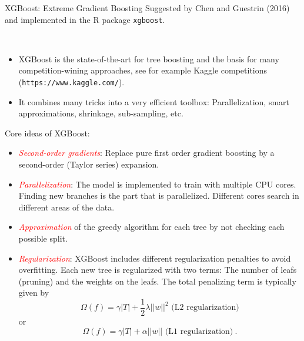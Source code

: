 \documentclass[
  10pt,
  ignorenonframetext,
]{beamer}
\providecommand{\tightlist}{%
  \setlength{\itemsep}{0pt}\setlength{\parskip}{0pt}}
\begin{document}
\begin{frame}[fragile]{XGBoost: Extreme Gradient Boosting}
\protect\hypertarget{xgboost-extreme-gradient-boosting}{}
Suggested by Chen and Guestrin (2016) and implemented in the R package
\texttt{xgboost}.

\(~\)

\begin{itemize}
\tightlist
\item
  XGBoost is the state-of-the-art for tree boosting and the basis for
  many competition-wining approaches, see for example Kaggle
  competitions (\texttt{https://www.kaggle.com/}).
\end{itemize}

\vspace{2mm}

\begin{itemize}
\tightlist
\item
  It combines many tricks into a very efficient toolbox:
  Parallelization, smart approximations, shrinkage, sub-sampling, etc.
\end{itemize}
\end{frame}

\begin{frame}
Core ideas of XGBoost:

\begin{itemize}
\item
  \emph{\textcolor{red}{Second-order gradients}}: Replace pure first
  order gradient boosting by a second-order (Taylor series) expansion.
\item
  \emph{\textcolor{red}{Parallelization}}: The model is implemented to
  train with multiple CPU cores. Finding new branches is the part that
  is parallelized. Different cores search in different areas of the
  data.
\item
  \emph{\textcolor{red}{Approximation}} of the greedy algorithm for each
  tree by not checking each possible split.
\item
  \emph{\textcolor{red}{Regularization}}: XGBoost includes different
  regularization penalties to avoid overfitting. Each new tree is
  regularized with two terms: The number of leafs (pruning) and the
  weights on the leafs. The total penalizing term is typically given by
  \[\Omega(f) = \gamma |T| + \frac{1}{2}\lambda||w||^2  \text{ (L2 regularization)} \]
  or
  \[\Omega(f) = \gamma |T| +  \alpha ||w|| \text{ (L1 regularization)}  \ .  \]
\end{itemize}
\end{frame}
\end{document}
